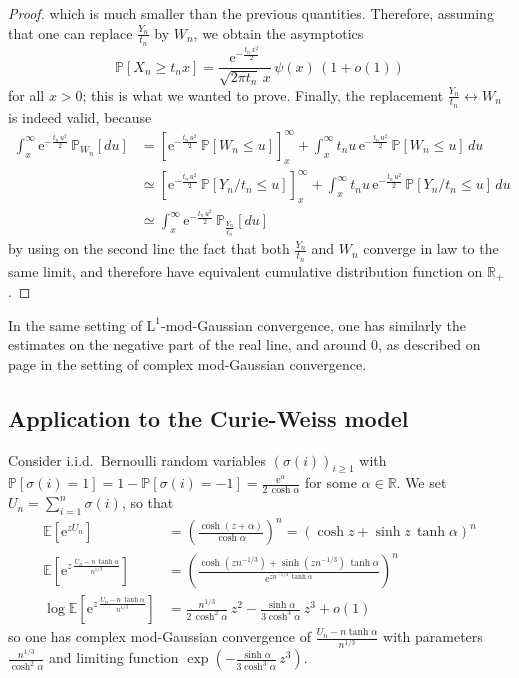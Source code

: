 \documentclass[12pt,a4paper,reqno]{amsart}
\newcommand{\R}{\mathbb{R}}
\newcommand{\E}{\mathrm{e}}
\newcommand{\esper}{\mathbb{E}}
\newcommand{\proba}{\mathbb{P}}
\theoremstyle{remark}
\begin{document}
\begin{proof}
which is much smaller than the previous quantities. Therefore, assuming that one can replace $\frac{Y_n}{t_n}$ by $W_n$, we obtain the asymptotics
$$\proba[X_n \geq t_n x] = \frac{\E^{-\frac{t_n\,x^2}{2}}}{\sqrt{2\pi t_n} \,x}\,\psi(x)\,(1+o(1))$$
for all $x>0$; this is what we wanted to prove. Finally, the replacement $\frac{Y_n}{t_n}\leftrightarrow W_n$ is indeed valid, because
\begin{align*}
\int_x^\infty \E^{-\frac{t_n\,u^2}{2}}\,\proba_{W_n}[du] &= \left[\E^{-\frac{t_n\,u^2}{2}}\,\proba[W_n \leq u]\right]_x^\infty +\int_x^\infty t_n u\,\E^{-\frac{t_n\,u^2}{2}}\,\proba[W_n \leq u]\,du \\
&\simeq \left[\E^{-\frac{t_n\,u^2}{2}}\,\proba[Y_n/t_n \leq u]\right]_x^\infty + \int_x^\infty t_n u\,\E^{-\frac{t_n\,u^2}{2}}\,\proba[Y_n/t_n \leq u]\,du\\
&\simeq \int_x^\infty \E^{-\frac{t_n\,u^2}{2}}\,\proba_{\frac{Y_n}{t_n}}[du] 
\end{align*}
by using on the second line the fact that both $\frac{Y_n}{t_n}$ and $W_n$ converge in law to the same limit, and therefore have equivalent cumulative distribution function on $\R_+$.
\end{proof}
\bigskip

In the same setting of $\mathrm{L}^1$-mod-Gaussian convergence, one has similarly the estimates on the negative part of the real line, and around $0$, as described on page \pageref{eq:upbound} in the setting of complex mod-Gaussian convergence.\medskip




\subsection{Application to the Curie-Weiss model}\label{subsec:curieweiss}
Consider i.i.d.~Bernoulli random variables $(\sigma(i))_{i \geq 1}$ with $\proba[\sigma(i)=1]=1-\proba[\sigma(i)=-1]=\frac{\E^{\alpha}}{2\,\cosh\alpha}$ for some $\alpha \in\R$. We set $U_n=\sum_{i=1}^n \sigma(i)$, so that
\begin{align*}
\esper[\E^{zU_n}]&=\left(\frac{\cosh (z+\alpha)}{\cosh \alpha}\right)^n=\left(\cosh z + \sinh z \,\tanh \alpha\right)^n \\
\esper\!\left[\E^{z\,\frac{U_n-n\,\tanh\alpha}{n^{1/3}}}\right]&=\left(\frac{\cosh (zn^{-1/3}) + \sinh (zn^{-1/3}) \,\tanh \alpha}{\E^{zn^{-1/3}\,\tanh \alpha}}\right)^n\\
\log \esper\!\left[\E^{z\,\frac{U_n-n\,\tanh\alpha}{n^{1/3}}}\right] &=\frac{n^{1/3}}{2\,\cosh^2 \alpha}\,z^2-\frac{\sinh \alpha}{3 \cosh^3 \alpha}\,z^3+o(1)
\end{align*}
so one has complex mod-Gaussian convergence of $\frac{U_n-n\tanh \alpha}{n^{1/3}}$ with parameters $\frac{n^{1/3}}{\cosh^2\alpha}$ and limiting function $\exp(-\frac{\sinh \alpha}{3\cosh^3 \alpha}\,z^3)$. \bigskip
\end{document}
